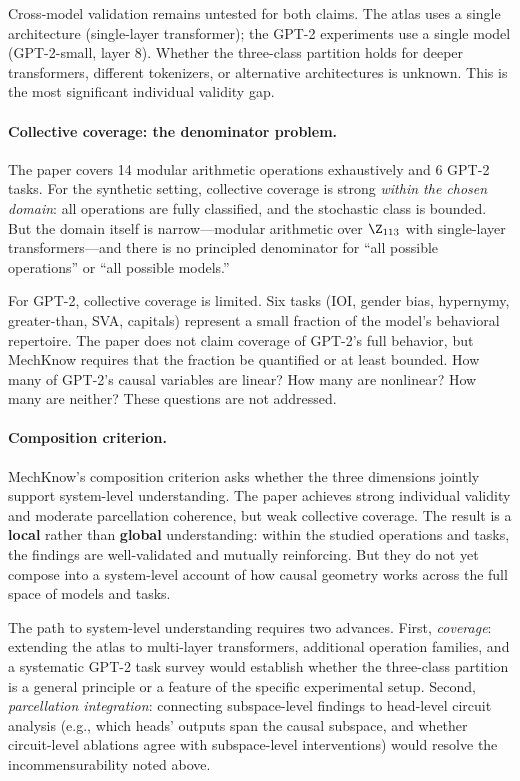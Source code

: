 Cross-model validation remains untested for both claims. The atlas uses a
single architecture (single-layer transformer); the GPT-2 experiments use a
single model (GPT-2-small, layer 8). Whether the three-class partition
holds for deeper transformers, different tokenizers, or alternative
architectures is unknown. This is the most significant individual validity
gap.

\paragraph{Collective coverage: the denominator problem.}
The paper covers 14 modular arithmetic operations exhaustively and 6 GPT-2
tasks. For the synthetic setting, collective coverage is strong \emph{within
the chosen domain}: all operations are fully classified, and the stochastic
class is bounded. But the domain itself is narrow---modular arithmetic over
$\Z_{113}$ with single-layer transformers---and there is no principled
denominator for ``all possible operations'' or ``all possible models.''

For GPT-2, collective coverage is limited. Six tasks (IOI, gender bias,
hypernymy, greater-than, SVA, capitals) represent a small fraction of the
model's behavioral repertoire. The paper does not claim coverage of GPT-2's
full behavior, but MechKnow requires that the fraction be quantified or at
least bounded. How many of GPT-2's causal variables are linear? How many are
nonlinear? How many are neither? These questions are not addressed.

\paragraph{Composition criterion.}
MechKnow's composition criterion asks whether the three dimensions jointly
support system-level understanding. The paper achieves strong individual
validity and moderate parcellation coherence, but weak collective coverage.
The result is a \textbf{local} rather than \textbf{global} understanding:
within the studied operations and tasks, the findings are well-validated and
mutually reinforcing. But they do not yet compose into a system-level account
of how causal geometry works across the full space of models and tasks.

The path to system-level understanding requires two advances. First,
\emph{coverage}: extending the atlas to multi-layer transformers, additional
operation families, and a systematic GPT-2 task survey would establish
whether the three-class partition is a general principle or a feature of the
specific experimental setup. Second, \emph{parcellation integration}:
connecting subspace-level findings to head-level circuit analysis (e.g.,
which heads' outputs span the causal subspace, and whether circuit-level
ablations agree with subspace-level interventions) would resolve the
incommensurability noted above.

